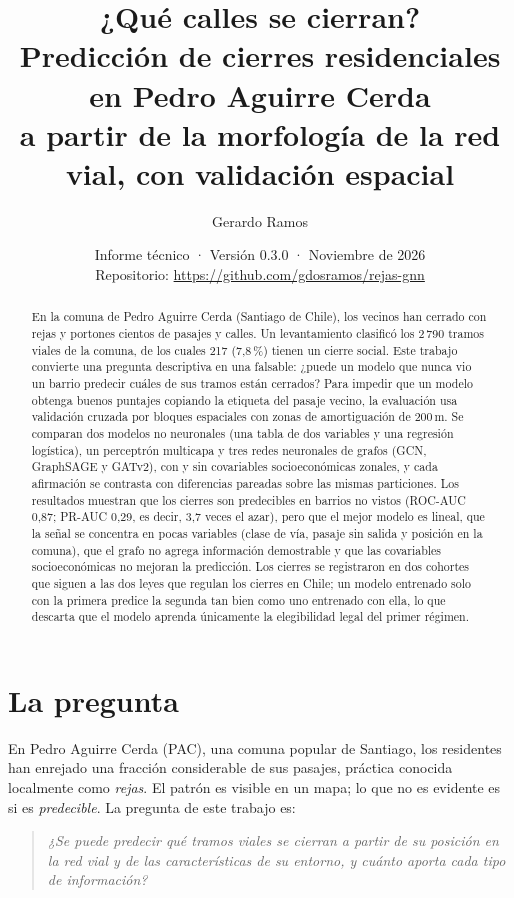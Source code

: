 \documentclass[11pt,a4paper]{article}
\title{\textbf{¿Qué calles se cierran?}\\[4pt]
\large Predicción de cierres residenciales en Pedro Aguirre Cerda\\
a partir de la morfología de la red vial, con validación espacial}
\author{Gerardo Ramos}
\date{Informe técnico · Versión 0.3.0 · Noviembre de 2026\\[2pt]
\small Repositorio: \url{https://github.com/gdosramos/rejas-gnn}}
\begin{document}
\maketitle

\begin{abstract}
\noindent En la comuna de Pedro Aguirre Cerda (Santiago de Chile), los vecinos han cerrado con rejas y
portones cientos de pasajes y calles. Un levantamiento clasificó los 2\,790 tramos viales de la
comuna, de los cuales 217 (7,8\,\%) tienen un cierre social. Este trabajo convierte una pregunta
descriptiva en una falsable: ¿puede un modelo que nunca vio un barrio predecir cuáles de sus tramos
están cerrados? Para impedir que un modelo obtenga buenos puntajes copiando la etiqueta del pasaje
vecino, la evaluación usa validación cruzada por bloques espaciales con zonas de amortiguación de
200\,m. Se comparan dos modelos no neuronales (una tabla de dos variables y una regresión
logística), un perceptrón multicapa y tres redes neuronales de grafos (GCN, GraphSAGE y GATv2),
con y sin covariables socioeconómicas zonales, y cada afirmación se contrasta con diferencias
pareadas sobre las mismas particiones. Los resultados muestran que los cierres son predecibles en
barrios no vistos (ROC-AUC 0,87; PR-AUC 0,29, es decir, 3,7 veces el azar), pero que el mejor
modelo es lineal, que la señal se concentra en pocas variables (clase de vía, pasaje sin salida y
posición en la comuna), que el grafo no agrega información demostrable y que las covariables
socioeconómicas no mejoran la predicción. Los cierres se registraron en dos cohortes que siguen a
las dos leyes que regulan los cierres en Chile; un modelo entrenado solo con la primera predice la
segunda tan bien como uno entrenado con ella, lo que descarta que el modelo aprenda únicamente la
elegibilidad legal del primer régimen.
\end{abstract}

\section{La pregunta}

En Pedro Aguirre Cerda (PAC), una comuna popular de Santiago, los residentes han enrejado una
fracción considerable de sus pasajes, práctica conocida localmente como \emph{rejas}. El patrón es
visible en un mapa; lo que no es evidente es si es \emph{predecible}. La pregunta de este trabajo es:

\begin{quote}
\emph{¿Se puede predecir qué tramos viales se cierran a partir de su posición en la red vial y de
las características de su entorno, y cuánto aporta cada tipo de información?}
\end{quote}
\end{document}
